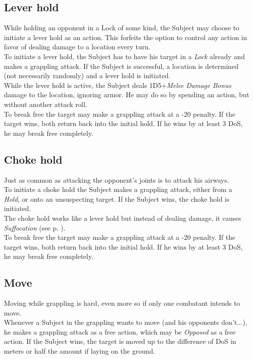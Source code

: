 \subsection*{Lever hold}
While holding an opponent in a Lock of some kind, the Subject may choose to initiate a lever hold as an action.
This forfeits the option to control any action in favor of dealing damage to a location every turn.
\\%
To initiate a lever hold,
	the Subject has to have his target in a \emph{Lock} already
	and makes a grappling attack.
If the Subject is successful,
	a location is determined (not necessarily randomly)
	and a lever hold is initiated.
\\%
While the lever hold is active,
	the Subject deals 1D5+\emph{Melee Damage Bonus} damage to the location,
	ignoring armor.
He may do so by spending an action,
	but without another attack roll.
\\%
To break free the target may make a grappling attack at a -20  penalty.
If the target wins, both return back into the initial hold.
If he wins by at least 3 DoS, he may break free completely.
\subsection*{Choke hold}
Just as common as attacking the opponent's joints is to attack his airways.\\
To initiate a choke hold the Subject makes a grappling attack,
	either from a \emph{Hold},
	or onto an unsuspecting target.
If the Subject wins, the choke hold is initiated.\\
The choke hold works like a lever hold but instead of dealing damage, it causes \emph{Suffocation} (see p. \pageref{hazards:suffocation}).\\
To break free the target may make a grappling attack at a -20  penalty.
If the target wins, both return back into the initial hold.
If he wins by at least 3 DoS, he may break free completely.
\subsection*{Move}
Moving while grappling is hard, even more so if only one combatant intends to move.\\
Whenever a Subject in the grappling wants to move
	(and his opponents don't...),
	he makes a grappling attack as a free action,
	which may be \emph{Opposed} as a free action.
If the Subject wins, the target is moved up to the difference of DoS in meters
	or half the amount if laying on the ground.

